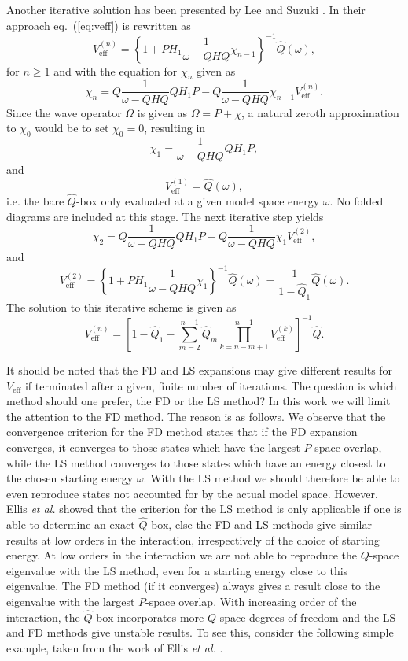 Another iterative solution has been
presented by Lee and Suzuki \cite{ls80}.
In their approach eq.\ (\ref{eq:veff}) is rewritten as
\begin{equation}
    V_{\mathrm{eff}}^{(n)}=
    \left\{1+PH_1 \frac{1}{\omega -QHQ}\chi_{n-1}\right\}^{-1}
    \hat{Q}(\omega), \label{eq:ls}
\end{equation}
for $n\geq 1$ and with the equation for $\chi_n$ given as
\begin{equation}
       \chi_n =Q\frac{1}{\omega - QHQ}QH_1 P -Q\frac{1}{\omega -QHQ}\chi_{n-1}
       V_{\mathrm{eff}}^{(n)}.
       \label{eq:chils}
\end{equation}
Since the wave operator $\Omega$ is given as $\Omega = P+\chi$, a natural
zeroth approximation to $\chi_0$ would be to set $\chi_0 = 0$, resulting in
\[
     \chi_1 =\frac{1}{\omega - QHQ}QH_1 P,
\]
and
\[
     V_{\mathrm{eff}}^{(1)}=\hat{Q}(\omega),
\]
i.e. the bare $\hat{Q}$-box only evaluated at a given model space energy
$\omega$. No folded diagrams are included at this stage.
The next iterative step yields
\[
     \chi_2 =Q\frac{1}{\omega - QHQ}QH_1 P-Q\frac{1}{\omega -QHQ}\chi_{1}
     V_{\mathrm{eff}}^{(2)},
\]
and
\[
    V_{\mathrm{eff}}^{(2)}=\left\{1+PH_1 
    \frac{1}{\omega -QHQ}\chi_{1}\right\}^{-1}
    \hat{Q}(\omega)=\frac{1}{1-\hat{Q}_1}\hat{Q}(\omega ).
\]
The solution to this iterative scheme is given as \cite{ls80}
\begin{equation}
     V_{\mathrm{eff}}^{(n)}=\left[1-\hat{Q}_{1}-\sum_{m=2}^{n-1}\hat{Q}_{m}
     \prod_{k=n-m+1}^{n-1}V_{\mathrm{eff}}^{(k)}\right]^{-1}\hat{Q}.
\end{equation}

It should be noted that the FD and LS expansions 
may give different results for $V_{\mathrm{eff}}$ if terminated after
a given, finite number of iterations. 
The question is which method should one prefer, the FD or the LS method?
In this work we will limit the attention to the FD method.
The reason is as follows. We observe that the convergence criterion for the FD
method states that if the FD expansion converges, it converges to those
states which have the largest $P$-space overlap, while the LS method
converges to those states which have an energy closest to the chosen 
starting energy $\omega$. With the LS method we should
therefore be able to even reproduce states not accounted for
by the actual model space. However, Ellis {\em et al.} \cite{eehho94}
showed that
the criterion for the LS method is only applicable if one is able
to determine an exact $\hat{Q}$-box, else the FD and LS methods
give similar results at low orders in the
interaction, irrespectively of
the choice of starting energy. 
At low orders in the interaction we are not able to reproduce the 
$Q$-space eigenvalue  with the LS method, even for a starting energy close to this
eigenvalue.
The FD method (if it converges) always gives a
result close to the  eigenvalue with the largest $P$-space
overlap. With increasing order of the interaction, the $\hat{Q}$-box
incorporates more $Q$-space degrees of freedom and the LS and FD methods
give unstable results. 
To see this, consider the following simple example, taken from
the work of Ellis {\em et al.} \cite{eehho94}.


